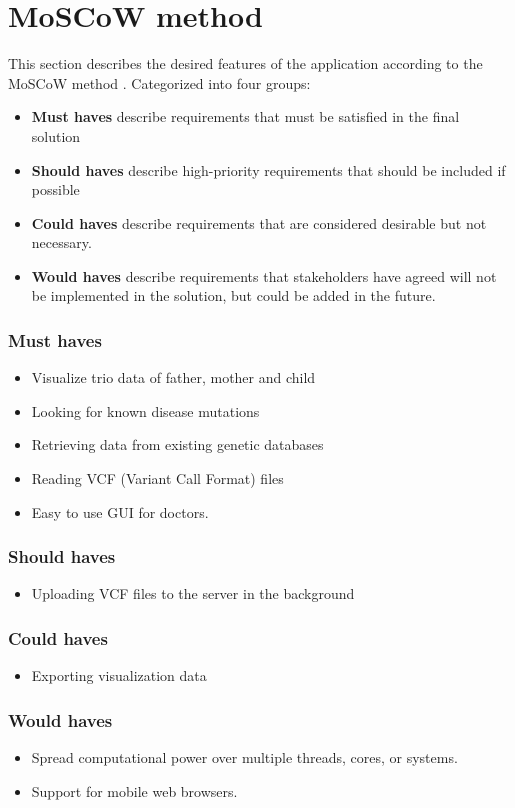 \section{MoSCoW method}
This section describes the desired features of the application according to the MoSCoW method \cite{brennan2009guide}. Categorized into four groups:
\begin{itemize}
\item \textbf{Must haves} describe requirements that must be satisfied in the final solution
\item \textbf{Should haves} describe high-priority requirements that should be included if possible
\item \textbf{Could haves} describe requirements that are considered desirable but not necessary.
\item \textbf{Would haves} describe requirements that stakeholders have agreed will not be implemented in the solution, but could be added in the future.
\end{itemize}

\subsubsection{Must haves}
\begin{itemize}
\item Visualize trio data of father, mother and child
\item Looking for known disease mutations
\item Retrieving data from existing genetic databases
\item Reading VCF (Variant Call Format) files 
\item Easy to use GUI for doctors.
\end{itemize}

\subsubsection{Should haves}
\begin{itemize}
\item Uploading VCF files to the server in the background
\end{itemize}


\subsubsection{Could haves}
\begin{itemize}
\item Exporting visualization data
\end{itemize}

\subsubsection{Would haves}
\begin{itemize}
\item Spread computational power over multiple threads, cores, or systems.
\item Support for mobile web browsers.
\end{itemize}